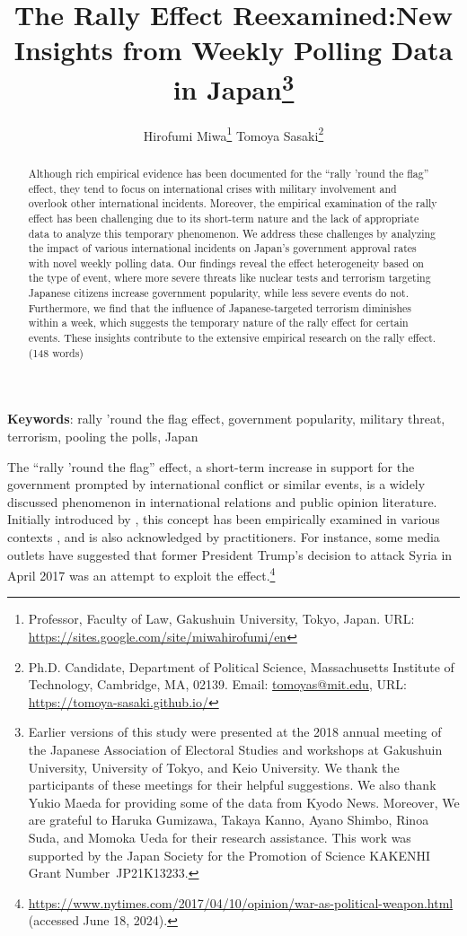 \documentclass[letterpaper,12pt]{scrartcl}
\title{
  \textbf{\textsf{\LARGE The Rally Effect Reexamined:\linebreak New Insights from Weekly Polling Data in Japan}}\if0\blind\thanks{\hspace{3mm}Earlier versions of this study were presented at the 2018 annual meeting of the Japanese Association of Electoral Studies and workshops at Gakushuin University, University of Tokyo, and Keio University. We thank the participants of these meetings for their helpful suggestions. We also thank Yukio Maeda for providing some of the data from Kyodo News. Moreover, We are grateful to Haruka Gumizawa, Takaya Kanno, Ayano Shimbo, Rinoa Suda, and Momoka Ueda for their research assistance. This work was supported by the Japan Society for the Promotion of Science KAKENHI Grant Number~JP21K13233.} \fi
}
\author{
  \if0\blind
  \hspace{1.5in}
  Hirofumi Miwa\thanks{Professor, Faculty of Law, Gakushuin University,
  Tokyo, Japan. URL: \href{https://sites.google.com/site/miwahirofumi/en}{https://sites.google.com/site/miwahirofumi/en}}
  \hspace{.7in}
  Tomoya Sasaki\thanks{Ph.D. Candidate, Department of
  Political Science, Massachusetts Institute of Technology,
  Cambridge, MA, 02139. Email:
  \href{mailto:tomoyas@mit.edu}{tomoyas@mit.edu},
  URL: \href{https://tomoya-sasaki.github.io/}{https://tomoya-sasaki.github.io/}}
  \fi
}
\date{}
\renewcommand{\footnotelayout}{\setstretch{1}}
\begin{document}
\maketitle
\thispagestyle{empty}
\setcounter{page}{0}
\parindent=20pt

\vspace{-5mm}
\begin{abstract}
\noindent
Although rich empirical evidence has been documented for the ``rally 'round the flag'' effect, they tend to focus on international crises with military involvement and overlook other international incidents. Moreover, the empirical examination of the rally effect has been challenging due to its short-term nature and the lack of appropriate data to analyze this temporary phenomenon. We address these challenges by analyzing the impact of various international incidents on Japan's government approval rates with novel weekly polling data. Our findings reveal the effect heterogeneity based on the type of event, where more severe threats like nuclear tests and terrorism targeting Japanese citizens increase government popularity, while less severe events do not. Furthermore, we find that the influence of Japanese-targeted terrorism diminishes within a week, which suggests the temporary nature of the rally effect for certain events. These insights contribute to the extensive empirical research on the rally effect. (148 words)
\end{abstract}

\bigskip
\bigskip
\noindent \textbf{Keywords}: rally 'round the flag effect, government popularity, military threat, terrorism, pooling the polls, Japan

\newpage
\doublespacing

\noindent
The ``rally 'round the flag'' effect, a short-term increase in support for the government prompted by international conflict or similar events, is a widely discussed phenomenon in international relations and public opinion literature. Initially introduced by \citet{Mueller1970APSR}, this concept has been empirically examined in various contexts \citep[e.g.,][]{Oneal1995PolitBehav,Baker2001JCR,Chapman2004JCR,Lai2005ISQ,seo2023}, and is also acknowledged by practitioners. For instance, some media outlets have suggested that former President Trump's decision to attack Syria in April 2017 was an attempt to exploit the effect.\footnote{\url{https://www.nytimes.com/2017/04/10/opinion/war-as-political-weapon.html} (accessed June 18, 2024).}
\end{document}
